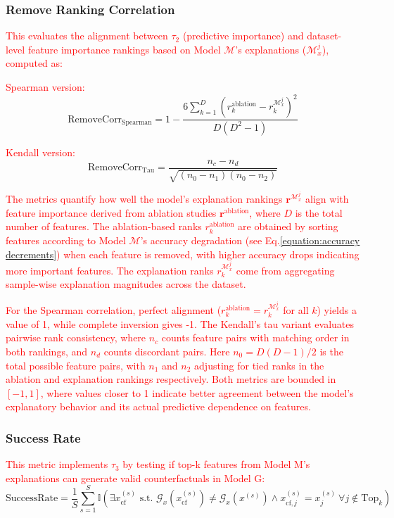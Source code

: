 \subsubsection*{Remove Ranking Correlation}
\textcolor{red}{This evaluates the alignment between $\tau_2$ (predictive importance) and dataset-level feature importance rankings based on Model $\mathcal{M}$'s explanations ($\mathcal{M}_x^j$), computed as:}

\textcolor{red}{Spearman version:}
\begin{equation}
\text{RemoveCorr}_{\text{Spearman}} = 1 - \frac{6\sum_{k=1}^D (r_k^{\text{ablation}} - r_k^{\mathcal{M}_x^{j}})^2}{D(D^2-1)}
\end{equation}

\textcolor{red}{Kendall version:}
\begin{equation}
\text{RemoveCorr}_{\text{Tau}} = \frac{n_c - n_d}{\sqrt{(n_0 - n_1)(n_0 - n_2)}}
\end{equation}

\textcolor{red}{The metrics quantify how well the model's explanation rankings $\mathbf{r}^{\mathcal{M}_x^{j}}$ align with feature importance derived from ablation studies $\mathbf{r}^{\text{ablation}}$, where $D$ is the total number of features. The ablation-based ranks $r_k^{\text{ablation}}$ are obtained by sorting features according to Model $\mathcal{M}$'s accuracy degradation (see Eq.\ref{equation:accuracy decrements}) when each feature is removed, with higher accuracy drops indicating more important features. The explanation ranks $r_k^{\mathcal{M}_x^{j}}$ come from aggregating sample-wise explanation magnitudes across the dataset.}

\textcolor{red}{For the Spearman correlation, perfect alignment ($r_k^{\text{ablation}} = r_k^{\mathcal{M}_x^{j}}$ for all $k$) yields a value of 1, while complete inversion gives -1. The Kendall's tau variant evaluates pairwise rank consistency, where $n_c$ counts feature pairs with matching order in both rankings, and $n_d$ counts discordant pairs. Here $n_0 = D(D-1)/2$ is the total possible feature pairs, with $n_1$ and $n_2$ adjusting for tied ranks in the ablation and explanation rankings respectively. Both metrics are bounded in $[-1,1]$, where values closer to 1 indicate better agreement between the model's explanatory behavior and its actual predictive dependence on features.}

\subsubsection*{Success Rate}
\textcolor{red}{This metric implements $\tau_3$ by testing if top-k features from Model M's explanations can generate valid counterfactuals in Model G:}
\begin{equation}
\text{SuccessRate} = \frac{1}{S}\sum_{s=1}^S \mathbb{I}\left(\exists x_{\text{cf}}^{(s)} \text{ s.t. } \mathcal{G}_x(x_{\text{cf}}^{(s)}) \neq \mathcal{G}_x(x^{(s)}) \land x_{\text{cf},j}^{(s)} = x_j^{(s)}\ \forall j \notin \text{Top}_k\right)
\end{equation}

